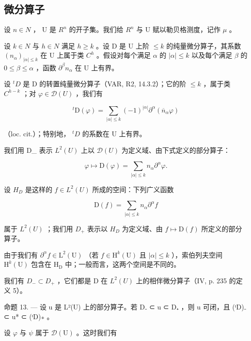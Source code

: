 \subsection{微分算子}

设 \(n \in N\) ， U 是 \(R^{n}\) 的开子集。我们给 \(R^{n}\) 与 U 赋以勒贝格测度，记作 \(\mu\) 。

设 \(k \in N\) 与 \(h \in N\) 满足 \(h \geqslant k\) 。设 D 是 U 上阶 \(\leqslant k\) 的纯量微分算子，其系数 \((n_{\alpha})_{|\alpha| \leqslant k}\) 在 U 上属于类 \(C^{h}\) 。假设对每个满足 \(\alpha\) 的 \(|\alpha| \leqslant k\) 以及每个满足 \(\beta\) 的 \(0 \leqslant \beta \leqslant \alpha\) ，函数 \(\partial^{\beta} n_{\alpha}\) 在 U 上有界。

设 \({}^{t}D\) 是 D 的转置纯量微分算子（VAR, R2, 14.3.2）；它的阶 \(\leqslant k\) ，属于类 \(C^{h-k}\) ；对 \(\varphi\in\mathcal{D}(U)\) ，我们有

\[
{ } ^ { t } \mathrm{D} ( \varphi ) = \sum _ { | \alpha | \leqslant k } ( - 1 ) ^ { | \alpha | } \partial ^ { \alpha } ( \overline { { n } } _ { \alpha } \varphi )
\]

（loc. cit.）；特别地， \({}^{t}D\) 的系数在 U 上有界。

我们用 D\_ 表示 \(L^{2}(U)\) 上以 \(\mathcal{D}(U)\) 为定义域、由下式定义的部分算子：

\[
\varphi \mapsto \mathrm{D} (\varphi) = \sum_ {| \alpha | \leqslant k} n _ {\alpha} \partial^ {\alpha} \varphi .\tag{5}
\]

设 \(H_{D}\) 是这样的 \(f \in L^{2}(U)\) 所成的空间：下列广义函数

\[
\mathrm{D} (f) = \sum_ {| \alpha | \leqslant k} n _ {\alpha} \partial^ {\alpha} f
\]

属于 \(L^{2}(U)\) ；我们用 \(D_{+}\) 表示以 \(H_{D}\) 为定义域、由 \(f \mapsto \mathrm{D}(f)\) 所定义的部分算子。

由于我们有 \(\partial^{\alpha}f\in \mathrm{L}^{2}(\mathrm{U})\) （若 \(f\in \mathrm{H}^k (\mathrm{U})\) 且 \(|\alpha |\leqslant k\) ），索伯列夫空间 \(\mathrm{H}^k (\mathrm{U})\) 包含在 \(\mathrm{H}_{\mathrm{D}}\) 中；一般而言，这两个空间是不同的。

我们有 \(D_{-} \subset D_{+}\) ，它们都是 D 在 \(L^{2}(U)\) 上的相伴微分算子（IV, p. 235 的定义 5）。

命题 13. --- 设 u 是 L²(U) 上的部分算子。若 D₋ ⊂ u ⊂ D₊ ，则 u 可闭，且 (ᵗD)₋ ⊂ u* ⊂ (ᵗD)₊ 。

设 \(\varphi\) 与 \(\psi\) 属于 \(\mathcal{D}(\mathrm{U})\) 。这时我们有

